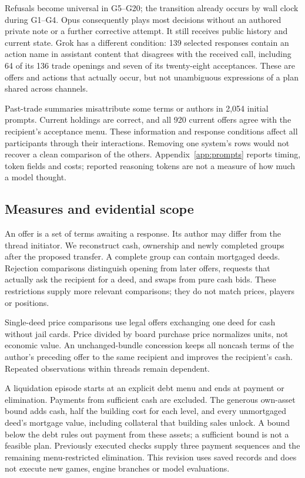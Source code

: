 Refusals become universal in G5--G20; the transition already occurs by wall clock during G1--G4. Opus consequently plays most decisions without an authored private note or a further corrective attempt. It still receives public history and current state. Grok has a different condition: 139 selected responses contain an action name in assistant content that disagrees with the received call, including 64 of its 136 trade openings and seven of its twenty-eight acceptances. These are offers and actions that actually occur, but not unambiguous expressions of a plan shared across channels.

Past-trade summaries misattribute some terms or authors in 2,054 initial prompts. Current holdings are correct, and all 920 current offers agree with the recipient's acceptance menu. These information and response conditions affect all participants through their interactions. Removing one system's rows would not recover a clean comparison of the others. Appendix~\ref{app:prompts} reports timing, token fields and costs; reported reasoning tokens are not a measure of how much a model thought.

\subsection{Measures and evidential scope}
An offer is a set of terms awaiting a response. Its author may differ from the thread initiator. We reconstruct cash, ownership and newly completed groups after the proposed transfer. A complete group can contain mortgaged deeds. Rejection comparisons distinguish opening from later offers, requests that actually ask the recipient for a deed, and swaps from pure cash bids. These restrictions supply more relevant comparisons; they do not match prices, players or positions.

Single-deed price comparisons use legal offers exchanging one deed for cash without jail cards. Price divided by board purchase price normalizes units, not economic value. An unchanged-bundle concession keeps all noncash terms of the author's preceding offer to the same recipient and improves the recipient's cash. Repeated observations within threads remain dependent.

A liquidation episode starts at an explicit debt menu and ends at payment or elimination. Payments from sufficient cash are excluded. The generous own-asset bound adds cash, half the building cost for each level, and every unmortgaged deed's mortgage value, including collateral that building sales unlock. A bound below the debt rules out payment from these assets; a sufficient bound is not a feasible plan. Previously executed checks supply three payment sequences and the remaining menu-restricted elimination. This revision uses saved records and does not execute new games, engine branches or model evaluations.

